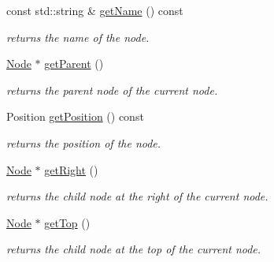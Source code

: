 \begin{DoxyCompactItemize}
\item 
\mbox{\label{class_open_chams_1_1_node_a3fd7335faa33dce2f87c7e50eef3e294}} 
const std\+::string \& \hyperlink{class_open_chams_1_1_node_a3fd7335faa33dce2f87c7e50eef3e294}{get\+Name} () const
\begin{DoxyCompactList}\small\item\em returns the name of the node. \end{DoxyCompactList}\item 
\mbox{\label{class_open_chams_1_1_node_afa302489ba7f4c55c5de696773c3d57b}} 
\hyperlink{class_open_chams_1_1_node}{Node} $\ast$ \hyperlink{class_open_chams_1_1_node_afa302489ba7f4c55c5de696773c3d57b}{get\+Parent} ()
\begin{DoxyCompactList}\small\item\em returns the parent node of the current node. \end{DoxyCompactList}\item 
\mbox{\label{class_open_chams_1_1_node_a566f4d0bebb46cfd31384a8394a7dbb9}} 
Position \hyperlink{class_open_chams_1_1_node_a566f4d0bebb46cfd31384a8394a7dbb9}{get\+Position} () const
\begin{DoxyCompactList}\small\item\em returns the position of the node. \end{DoxyCompactList}\item 
\mbox{\label{class_open_chams_1_1_node_a9533ddcf078ddfc2a4e9bd9ffafa51cb}} 
\hyperlink{class_open_chams_1_1_node}{Node} $\ast$ \hyperlink{class_open_chams_1_1_node_a9533ddcf078ddfc2a4e9bd9ffafa51cb}{get\+Right} ()
\begin{DoxyCompactList}\small\item\em returns the child node at the right of the current node. \end{DoxyCompactList}\item 
\mbox{\label{class_open_chams_1_1_node_af59967a8c2d5a04ca0a58e2ef29bead1}} 
\hyperlink{class_open_chams_1_1_node}{Node} $\ast$ \hyperlink{class_open_chams_1_1_node_af59967a8c2d5a04ca0a58e2ef29bead1}{get\+Top} ()
\begin{DoxyCompactList}\small\item\em returns the child node at the top of the current node. \end{DoxyCompactList}\item 

\end{DoxyCompactItemize}
